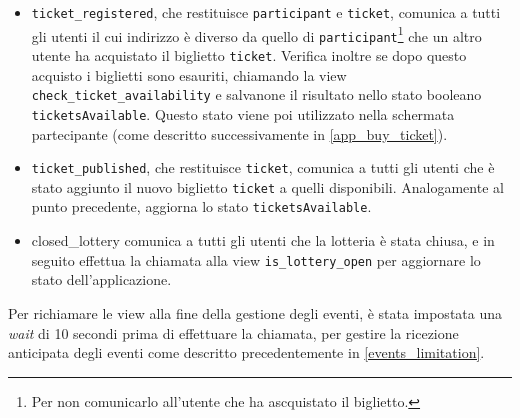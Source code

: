 \documentclass[12pt,a4paper,openright,twoside]{report}
\begin{document}
\begin{itemize}
    \item \texttt{ticket\_registered}, che restituisce \texttt{participant} e \texttt{ticket}, comunica a tutti gli utenti il cui indirizzo è diverso da quello di \texttt{participant}\footnote{Per non comunicarlo all'utente che ha ascquistato il biglietto.} che un altro utente ha acquistato il biglietto \texttt{ticket}. Verifica inoltre se dopo questo acquisto i biglietti sono esauriti, chiamando la view \texttt{check\_ticket\_availability} e salvanone il risultato nello stato booleano \texttt{ticketsAvailable}. Questo stato viene poi utilizzato nella schermata partecipante (come descritto successivamente in \ref{app_buy_ticket}).
    \item \texttt{ticket\_published}, che restituisce \texttt{ticket}, comunica a tutti gli utenti che è stato aggiunto il nuovo biglietto \texttt{ticket} a quelli disponibili. Analogamente al punto precedente, aggiorna lo stato \texttt{ticketsAvailable}.
    \item closed\_lottery comunica a tutti gli utenti che la lotteria è stata chiusa, e in seguito effettua la chiamata alla view \texttt{is\_lottery\_open} per aggiornare lo stato dell'applicazione.
\end{itemize}
Per richiamare le view alla fine della gestione degli eventi, è stata impostata una \textit{wait} di 10 secondi prima di effettuare la chiamata, per gestire la ricezione anticipata degli eventi come descritto precedentemente in \ref{events_limitation}.
\end{document}
